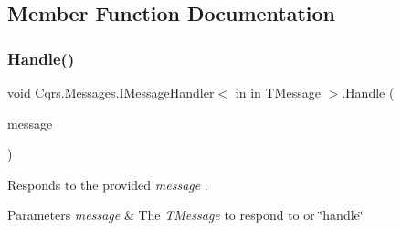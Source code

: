 \subsection{Member Function Documentation}
\mbox{\label{interfaceCqrs_1_1Messages_1_1IMessageHandler_a4d68d2c919afce06ce893caabd73f424_a4d68d2c919afce06ce893caabd73f424}} 
\subsubsection{\texorpdfstring{Handle()}{Handle()}}
{\footnotesize\ttfamily void \hyperlink{interfaceCqrs_1_1Messages_1_1IMessageHandler}{Cqrs.\+Messages.\+I\+Message\+Handler}$<$ in in T\+Message $>$.Handle (\begin{DoxyParamCaption}\item[{T\+Message}]{message }\end{DoxyParamCaption})}



Responds to the provided {\itshape message} . 


\begin{DoxyParams}{Parameters}
{\em message} & The {\itshape T\+Message}  to respond to or \char`\"{}handle\char`\"{}\\
\hline
\end{DoxyParams}

